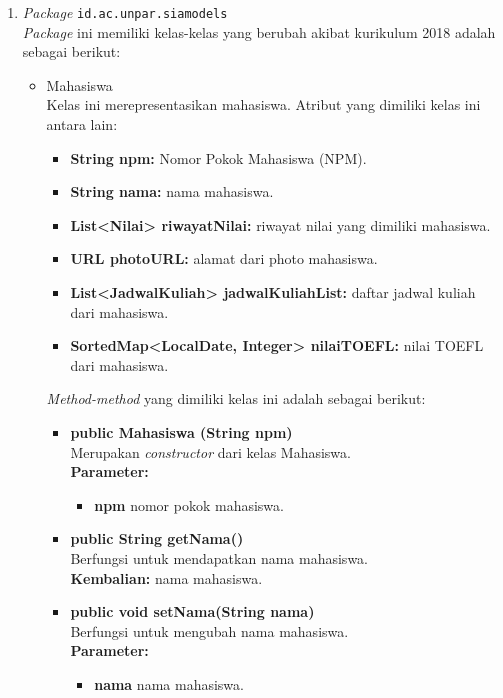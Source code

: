 \begin{enumerate}
	\item \textit{Package} \texttt{id.ac.unpar.siamodels}\\
	\textit{Package} ini memiliki kelas-kelas yang berubah akibat kurikulum 2018 adalah sebagai berikut:
	\begin{itemize}
			\item Mahasiswa\\
				Kelas ini merepresentasikan mahasiswa. Atribut yang dimiliki kelas ini antara lain:
				\begin{itemize}
					\item \textbf{String npm:} Nomor Pokok Mahasiswa (NPM).
					\item \textbf{String nama:} nama mahasiswa.
					\item \textbf{List<Nilai> riwayatNilai:} riwayat nilai 		yang dimiliki mahasiswa.
					\item \textbf{URL photoURL:} alamat dari photo mahasiswa.
					\item \textbf{List<JadwalKuliah> jadwalKuliahList:} daftar jadwal kuliah dari mahasiswa.
					\item \textbf{SortedMap<LocalDate, Integer> nilaiTOEFL:} nilai TOEFL dari mahasiswa.
				\end{itemize}
			\textit{Method-method} yang dimiliki kelas ini adalah sebagai berikut:
				\begin{itemize}
					\item \textbf{public Mahasiswa (String npm)}\\
					Merupakan \textit{constructor} dari kelas Mahasiswa.\\
					\textbf{Parameter:}
					\begin{itemize}
						\item \textbf{npm} nomor pokok mahasiswa.
					\end{itemize}
					\item \textbf{public String getNama()}\\
						Berfungsi untuk mendapatkan nama mahasiswa.\\
						\textbf{Kembalian:} nama mahasiswa.

					\item \textbf{public void setNama(String nama)}\\
						Berfungsi untuk mengubah nama mahasiswa.\\
						\textbf{Parameter:}
						\begin{itemize}
							\item \textbf{nama} nama mahasiswa.
						\end{itemize}
				

\end{itemize}
\end{itemize}
\end{enumerate}
